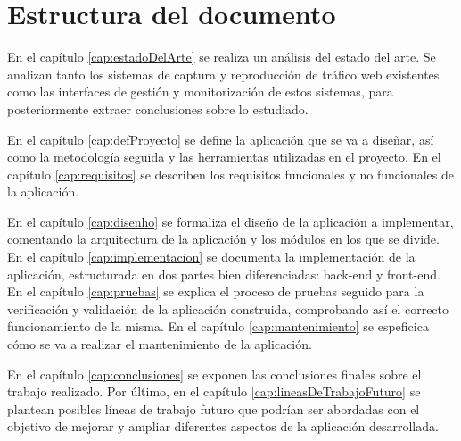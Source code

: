 \section{Estructura del documento}

En el capítulo \ref{cap:estadoDelArte} se realiza un análisis del estado del arte. Se analizan tanto los sistemas de captura y reproducción de tráfico web existentes como las interfaces de gestión y monitorización de estos sistemas, para posteriormente extraer conclusiones sobre lo estudiado.

En el capítulo \ref{cap:defProyecto} se define la aplicación que se va a diseñar, así como la metodología seguida y las herramientas utilizadas en el proyecto.
En el capítulo \ref{cap:requisitos} se describen los requisitos funcionales y no funcionales de la aplicación.

En el capítulo \ref{cap:disenho} se formaliza el diseño de la aplicación a implementar, comentando la arquitectura de la aplicación y los módulos en los que se divide.
En el capítulo \ref{cap:implementacion} se documenta la implementación de la aplicación, estructurada en dos partes bien diferenciadas: \gls{back-end} y \gls{front-end}.
En el capítulo \ref{cap:pruebas} se explica el proceso de pruebas seguido para la verificación y validación de la aplicación construida, comprobando así el correcto funcionamiento de la misma.
En el capítulo \ref{cap:mantenimiento} se espeficica cómo se va a realizar el mantenimiento de la aplicación.

En el capítulo \ref{cap:conclusiones} se exponen las conclusiones finales sobre el trabajo realizado. Por último, en el capítulo \ref{cap:lineasDeTrabajoFuturo} se plantean posibles líneas de trabajo futuro que podrían ser abordadas con el objetivo de mejorar y ampliar diferentes aspectos de la aplicación desarrollada.